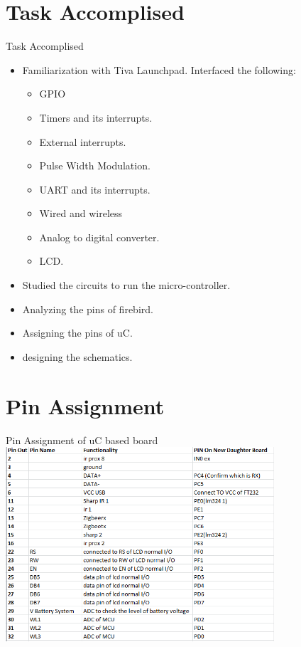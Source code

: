\documentclass[10pt, a4paper]{beamer}
\begin{document}
\section{Task Accomplised}
\begin{frame}{Task Accomplised}
	\begin{itemize}
		\item Familiarization with Tiva Launchpad. Interfaced the following:
			\begin{itemize}
				\item GPIO
				\item Timers and its interrupts.
				\item External interrupts.
				\item Pulse Width Modulation.
				\item UART and its interrupts.
				\item Wired and wireless 
				\item Analog to digital converter.
				\item LCD.
			\end{itemize}
		\item Studied the circuits to run the micro-controller. 
		\item Analyzing the pins of firebird.
		\item Assigning the pins of uC.
		\item designing the schematics.
	\end{itemize}
\end{frame}
\section{Pin Assignment}
	\begin{frame}{Pin Assignment of uC based board}
		{\includegraphics[width=10cm]{1.PNG}}
	\end{frame}
\end{document}
